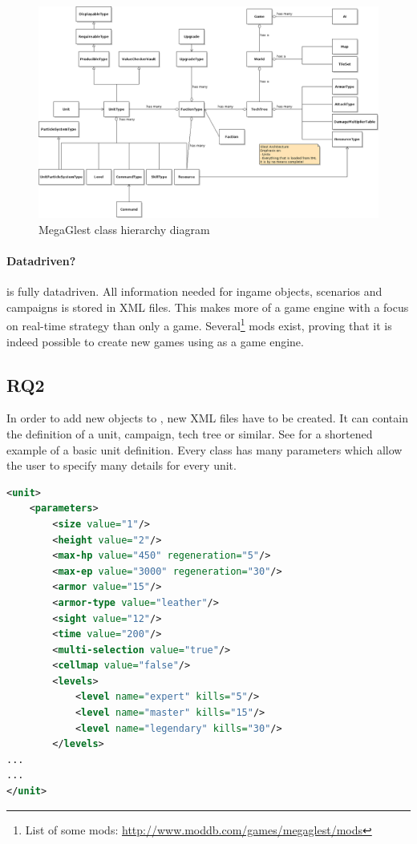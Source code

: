\begin{figure}[h!]
    \centering
    \includegraphics[angle=90,width=\textwidth]{pics/gamehierarchy}
    \caption{MegaGlest class hierarchy diagram}
    \label{fig:glestclassh}
\end{figure}

\paragraph{Datadriven?}
\GLEST{} is fully datadriven. All information needed for ingame objects, scenarios and campaigns is stored in XML files.
This makes \GLEST{} more of a game engine with a focus on real-time strategy than only a game. Several\footnote{List of
some mods: \url{http://www.moddb.com/games/megaglest/mods}} mods exist, proving that it is indeed possible to create new
games using \GLEST{} as a game engine. 

\subsection{RQ2}
In order to add new objects to \GLEST{}, new XML files have to be created. It can contain the definition of a unit, campaign,
tech tree or similar. See  for a shortened example of a basic unit definition. Every class has many
parameters which allow the user to specify many details for every unit. 

\begin{lstlisting}[language=XML,caption=A basic \GLEST{} (shortened) unit definition in XML, label=glestxml]
<unit>
	<parameters>
		<size value="1"/>
		<height value="2"/>
		<max-hp value="450" regeneration="5"/>
		<max-ep value="3000" regeneration="30"/>
		<armor value="15"/>	
		<armor-type value="leather"/>
		<sight value="12"/>
		<time value="200"/>	
		<multi-selection value="true"/>	
		<cellmap value="false"/>
		<levels>
			<level name="expert" kills="5"/>
			<level name="master" kills="15"/>
			<level name="legendary" kills="30"/>
		</levels>
...
...
</unit>
\end{lstlisting}

